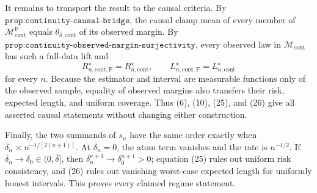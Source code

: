 It remains to transport the result to the causal criteria.  By \(\texttt{prop:continuity-causal-bridge}\), the causal clamp mean of every member of \(\mathcal M_{\mathrm{cont}}^{\mathrm F}\) equals \(\theta_{\delta,\mathrm{cont}}\) of its observed margin.  By \(\texttt{prop:continuity-observed-margin-surjectivity}\), every observed law in \(\mathcal M_{\mathrm{cont}}\) has such a full-data lift and
\[
 R_{n,\mathrm{cont},\mathrm F}^\star=R_{n,\mathrm{cont}}^\star,
 \qquad
 L_{n,\mathrm{cont},\mathrm F}^\star=L_{n,\mathrm{cont}}^\star
 \tag{27}
\]
for every \(n\).  Because the estimator and interval are measurable functions only of the observed sample, equality of observed margins also transfers their risk, expected length, and uniform coverage.  Thus (6), (10), (25), and (26) give all asserted causal statements without changing either construction.

Finally, the two summands of \(s_n\) have the same order exactly when
\(\delta_n\asymp n^{-1/[2(\kappa+1)]}\).  At \(\delta_n=0\), the atom term vanishes and the rate is \(n^{-1/2}\).  If \(\delta_n\to\delta_0\in(0,\bar\delta]\), then \(\delta_n^{\kappa+1}\to\delta_0^{\kappa+1}>0\); equation (25) rules out uniform risk consistency, and (26) rules out vanishing worst-case expected length for uniformly honest intervals.  This proves every claimed regime statement.
